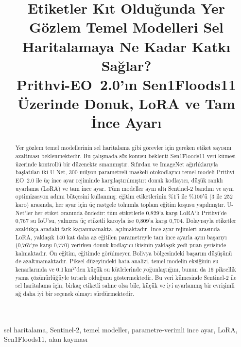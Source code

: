 \documentclass[conference]{IEEEtran}
\begin{document}
\title{Etiketler Kıt Olduğunda Yer Gözlem Temel Modelleri Sel Haritalamaya Ne Kadar Katkı Sağlar?\\
\large Prithvi-EO~2.0'ın Sen1Floods11 Üzerinde Donuk, LoRA ve Tam İnce Ayarı}

\author{
}

\maketitle

\begin{abstract}
Yer gözlem temel modellerinin sel haritalama gibi görevler için gereken etiket sayısını azaltması beklenmektedir. Bu çalışmada söz konusu beklenti Sen1Floods11 veri kümesi üzerinde kontrollü bir düzenekte sınanmıştır. Sıfırdan ve ImageNet ağırlıklarıyla başlatılan iki U-Net, 300 milyon parametreli maskeli otokodlayıcı temel modeli Prithvi-EO~2.0 ile üç ince ayar rejiminde karşılaştırılmıştır: donuk kodlayıcı, düşük ranklı uyarlama (LoRA) ve tam ince ayar. Tüm modeller aynı altı Sentinel-2 bandını ve aynı optimizasyon adımı bütçesini kullanmış; eğitim etiketlerinin \%1'i ile \%100'ü (3 ile 252 karo) arasında, her ayar için üç rastgele tohumla toplam \nruns{} eğitim koşusu yapılmıştır. U-Net'ler her etiket oranında öndedir: tüm etiketlerle 0,829'a karşı LoRA'lı Prithvi'de 0,767 su IoU'su, yalnızca üç etiketli karoyla ise 0,809'a karşı 0,704. Dolayısıyla etiketler azaldıkça aradaki fark kapanmamakta, açılmaktadır. İnce ayar rejimleri arasında LoRA, yaklaşık 140 kat daha az eğitilen parametreyle tam ince ayarla aynı başarıyı (0,767'ye karşı 0,770) verirken donuk kodlayıcı ikisinin yaklaşık yedi puan gerisinde kalmaktadır. Ön eğitim, eğitimde görülmeyen Bolivya bölgesindeki başarım düşüşünü de azaltmamaktadır. Piksel düzeyindeki hata analizi, temel modelin eksiğinin su kenarlarında ve 0,1\,km$^2$'den küçük su kütlelerinde yoğunlaştığını, bunun da 16 piksellik yama çözünürlüğüyle tutarlı olduğunu göstermektedir. Bu veri kümesinde Sentinel-2 ile sel haritalama için, birkaç etiketli sahne olsa bile, küçük ve iyi ayarlanmış bir evrişimli ağ daha iyi bir seçenek olmayı sürdürmektedir.
\end{abstract}

\begin{IEEEkeywords}
sel haritalama, Sentinel-2, temel modeller, parametre-verimli ince ayar, LoRA, Sen1Floods11, alan kayması
\end{IEEEkeywords}
\end{document}

